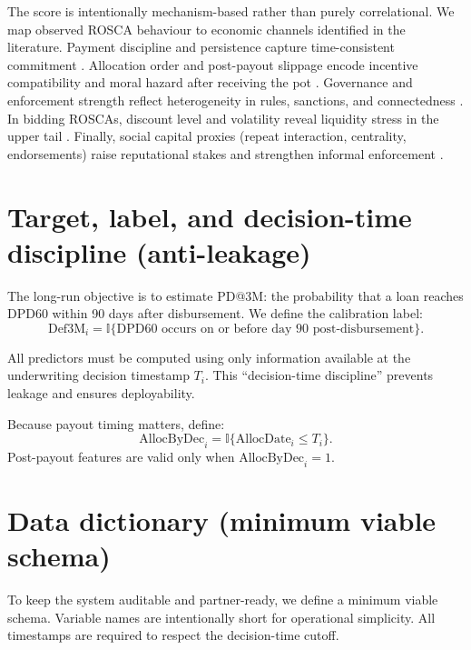 \documentclass[11t]{article}
\newcommand{\Indic}{\mathbb{I}}
\begin{document}
The score is intentionally mechanism-based rather than purely correlational. We map observed ROSCA behaviour to economic channels identified in the literature. Payment discipline and persistence capture time-consistent commitment \citet{Gugerty2007}. Allocation order and post-payout slippage encode incentive compatibility and moral hazard after receiving the pot \citet{BesleyCoateLoury1993}. Governance and enforcement strength reflect heterogeneity in rules, sanctions, and connectedness \citet{McNabbLeMayBoucherBonan2019}. In bidding ROSCAs, discount level and volatility reveal liquidity stress in the upper tail \citet{Klonner2003,CalomirisRajaraman1998}. Finally, social capital proxies (repeat interaction, centrality, endorsements) raise reputational stakes and strengthen informal enforcement \citet{SchreinerNagarajan2000}.

\section{Target, label, and decision-time discipline (anti-leakage)}

The long-run objective is to estimate PD@3M: the probability that a loan reaches DPD60 within 90 days after disbursement. We define the calibration label:
\begin{equation}
\text{Def3M}_i = \Indic\{\text{DPD60 occurs on or before day 90 post-disbursement}\}.
\end{equation}

All predictors must be computed using only information available at the underwriting decision timestamp $T_i$. This ``decision-time discipline'' prevents leakage and ensures deployability.

Because payout timing matters, define:
\begin{equation}
\text{AllocByDec}_i = \Indic\{\text{AllocDate}_i \le T_i\}.
\end{equation}
Post-payout features are valid only when $\text{AllocByDec}_i=1$.

\section{Data dictionary (minimum viable schema)}

To keep the system auditable and partner-ready, we define a minimum viable schema. Variable names are intentionally short for operational simplicity. All timestamps are required to respect the decision-time cutoff.
\end{document}
